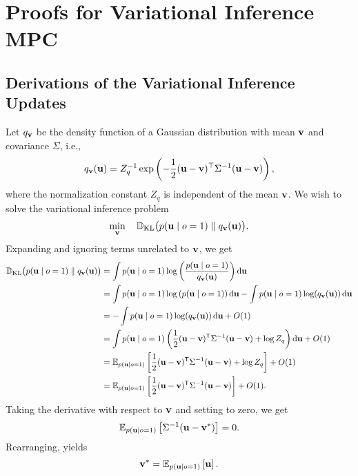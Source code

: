 \section{Proofs for Variational Inference MPC} 
\subsection{Derivations of the Variational Inference Updates} \label{app:VI Gauss}
Let $q_{\bf v}$ be the density function of a Gaussian distribution with mean ${\bf v}$ and covariance $\Sigma$, i.e.,
\begin{equation}
    q_{\bf v}({\bf u}) = Z_q^{-1} \exp\left(-\frac{1}{2}({\bf u}-{\bf v})^\top\Sigma^{-1}({\bf u}-{\bf v})\right),
\end{equation}
where the normalization constant $Z_q$ is independent of the mean ${\bf v}$.
We wish to solve the variational inference problem
\begin{equation}
    \min_{{\bf v}} \quad \mathbb{D}_{\mathrm{KL}}\bigl({ p({\bf u} \mid o=1) }\parallel { q_{\bf v}({\bf u}) }\bigr).
\end{equation}
Expanding and ignoring terms unrelated to ${\bf v}$, we get
\begin{align}
    \mathbb{D}_{\mathrm{KL}}\bigl({ p({\bf u} \mid o=1) }\parallel { q_{\bf v}({\bf u}) }\bigr)
    &= \int p({\bf u} \mid o=1) \log\left(\frac{p({\bf u} \mid o=1)}{q_{\bf v}({\bf u})}\right) \mathop{}\!\mathrm{d}{\bf u} \\
    &= \int p({\bf u} \mid o=1) \log\left(p({\bf u} \mid o=1)\right) \mathop{}\!\mathrm{d}{\bf u} -\int p({\bf u} \mid o=1) \log(q_{\bf v}({\bf u})) \mathop{}\!\mathrm{d}{\bf u}\\
    &= -\int p({\bf u} \mid o=1) \log(q_{\bf v}({\bf u})) \mathop{}\!\mathrm{d}{\bf u} + O(1) \\
    &=  \int p({\bf u} \mid o=1) \left( \frac{1}{2} ({\bf u} - {\bf v})^\mathsf{T} \Sigma^{-1} ({\bf u} - {\bf v}) + \log Z_q \right) \mathop{}\!\mathrm{d}{\bf u} + O(1) \\
    &= \mathbb{E}_{p({\bf u} \mid o=1)}\left[ \frac{1}{2} ({\bf u} - {\bf v})^\mathsf{T} \Sigma^{-1} ({\bf u} - {\bf v}) + \log Z_q \right] + O(1) \\
    &= \mathbb{E}_{p({\bf u} \mid o=1)}\left[ \frac{1}{2} ({\bf u} - {\bf v})^\mathsf{T} \Sigma^{-1} ({\bf u} - {\bf v}) \right] + O(1).
\end{align}
Taking the derivative with respect to ${\bf v}$ and setting to zero, we get
\begin{equation}
    \mathbb{E}_{p({\bf u} \mid o=1)}\left[ \Sigma^{-1} ({\bf u} - {\bf v}^*) \right] = 0.
\end{equation}
Rearranging, yields
\begin{equation}
    {\bf v}^* = \mathbb{E}_{p({\bf u} \mid o=1)}\left[ {\bf u} \right].
\end{equation}

